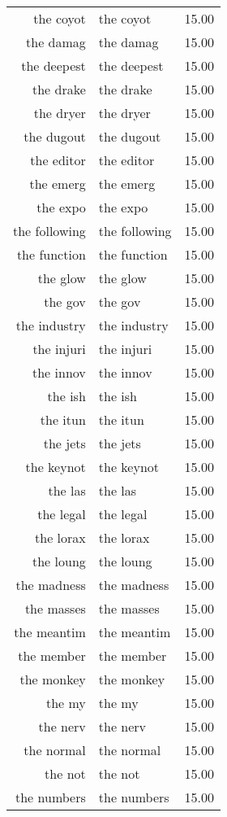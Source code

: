 \begin{table}[ht]
\begin{tabular}{rlr}
  the coyot & the coyot & 15.00 \\ 
  the damag & the damag & 15.00 \\ 
  the deepest & the deepest & 15.00 \\ 
  the drake & the drake & 15.00 \\ 
  the dryer & the dryer & 15.00 \\ 
  the dugout & the dugout & 15.00 \\ 
  the editor & the editor & 15.00 \\ 
  the emerg & the emerg & 15.00 \\ 
  the expo & the expo & 15.00 \\ 
  the following & the following & 15.00 \\ 
  the function & the function & 15.00 \\ 
  the glow & the glow & 15.00 \\ 
  the gov & the gov & 15.00 \\ 
  the industry & the industry & 15.00 \\ 
  the injuri & the injuri & 15.00 \\ 
  the innov & the innov & 15.00 \\ 
  the ish & the ish & 15.00 \\ 
  the itun & the itun & 15.00 \\ 
  the jets & the jets & 15.00 \\ 
  the keynot & the keynot & 15.00 \\ 
  the las & the las & 15.00 \\ 
  the legal & the legal & 15.00 \\ 
  the lorax & the lorax & 15.00 \\ 
  the loung & the loung & 15.00 \\ 
  the madness & the madness & 15.00 \\ 
  the masses & the masses & 15.00 \\ 
  the meantim & the meantim & 15.00 \\ 
  the member & the member & 15.00 \\ 
  the monkey & the monkey & 15.00 \\ 
  the my & the my & 15.00 \\ 
  the nerv & the nerv & 15.00 \\ 
  the normal & the normal & 15.00 \\ 
  the not & the not & 15.00 \\ 
  the numbers & the numbers & 15.00 \\ 

\end{tabular}
\end{table}
